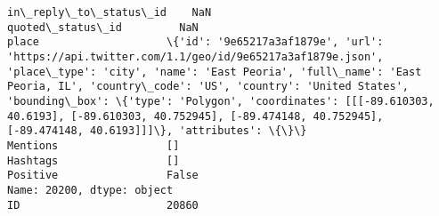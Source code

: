 \documentclass[11pt]{article}
\begin{document}
\begin{Verbatim}[commandchars=\\\{\}]
in\_reply\_to\_status\_id    NaN                                                                                                                                                                                                                                                                                                                                                                                                   
quoted\_status\_id         NaN                                                                                                                                                                                                                                                                                                                                                                                                   
place                    \{'id': '9e65217a3af1879e', 'url': 'https://api.twitter.com/1.1/geo/id/9e65217a3af1879e.json', 'place\_type': 'city', 'name': 'East Peoria', 'full\_name': 'East Peoria, IL', 'country\_code': 'US', 'country': 'United States', 'bounding\_box': \{'type': 'Polygon', 'coordinates': [[[-89.610303, 40.6193], [-89.610303, 40.752945], [-89.474148, 40.752945], [-89.474148, 40.6193]]]\}, 'attributes': \{\}\}
Mentions                 []                                                                                                                                                                                                                                                                                                                                                                                                    
Hashtags                 []                                                                                                                                                                                                                                                                                                                                                                                                    
Positive                 False                                                                                                                                                                                                                                                                                                                                                                                                 
Name: 20200, dtype: object
ID                       20860                                                                                                                                                                                                                                                                                                                                                                                                                                  

\end{Verbatim}
\end{document}
